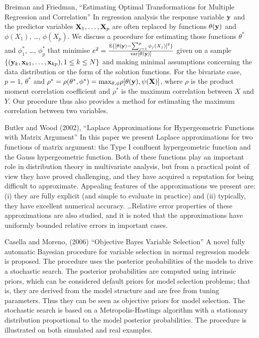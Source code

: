 \documentclass{amsart}[12pt]
\begin{document}
Breiman and Friedman, ``Estimating Optimal Transformations for Multiple Regression and Correlation''
In regression analysis the response variable ${\bf y}$ and the predictor variables ${\bf X}_1, \ldots, {\bf X}_p$ are often
replaced by functions $\theta({\bf y})$ and $\phi(X_1)$, \ldots, $\phi(X_p)$. We discuss a procedure for estimating
those functions $\theta^*$ and $\phi_1^*$, \ldots, $\phi_p^*$ that minimise
$e^2 = \frac{\mathbb{E}\{ [\theta({\bf y}) - \sum_{j=1}^p \phi_j (X_j)]^2 \}}{\text{var}[\theta({\bf y})]}$
given on a sample $\{ ({\bf y}_k, {\bf x}_{k1}, \ldots, {\bf x}_{kp}), 1 \leq k \leq N \}$ and making minimal assumptions
concerning the data distribution or the form of the solution functions. For the bivariate case, $p=1$,
$\theta^*$ and $\rho^*=\rho(\theta^*, \phi^*) = \text{max}_{\theta, \phi} \rho[\theta({\bf y}), \psi({\bf X})]$, where
$\rho$ is the product moment correlation coefficient and $\rho^*$ is the maximum correlation between $X$ and
$Y$. Our procedure thus also provides a method for estimating the maximum correlation between two variables.

Butler and Wood (2002), ``Laplace Approximations for Hypergeometric Functions with Matrix Argument''
In this paper we present Laplace approximations for two functions of matrix argument: the Type I confluent
hypergeometric function and the Gauss hypergeometric function. Both of these functions play an important role
in distribution theory in multivariate analysis, but from a practical point of view they have proved
challenging, and they have acquired a reputation for being difficult to approximate. Appealing features of the
approximations we present are: (i) they are fully explicit (and simple to evaluate in practice) and
(ii) typically, they have excellent numerical accuracy. \ldots Relative error properties of these
approximations are also studied, and it is noted that the approximations have uniformly bounded relative
errors in important cases.

Casella and Moreno, (2006) ``Objective Bayes Variable Selection''
A novel fully automatic Bayesian procedure for variable selection in normal regression models is proposed. The
procedure uses the posterior probabilities of the models to drive a stochastic search. The posterior
probabilities are computed using intrinsic priors, which can be considered default priors for model selection
problems; that is, they are derived from the model structure and are free from tuning parameters. Thus they
can be seen as objective priors for model selection. The stochastic search is based on a Metropolis-Hastings
algorithm with a stationary distribution proportional to the model posterior probabilities. The procedure is
illustrated on both simulated and real examples.
\end{document}
